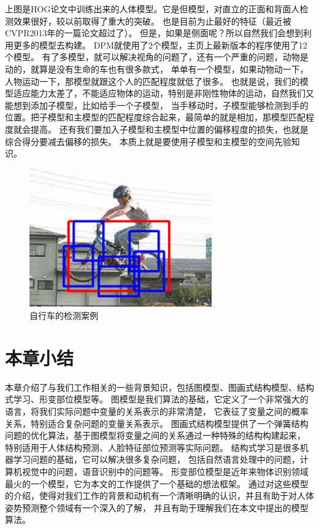上图是HOG论文中训练出来的人体模型。它是但模型，对直立的正面和背面人检测效果很好，较以前取得了重大的突破。
也是目前为止最好的特征（最近被CVPR2013年的一篇论文\cite{hsc}超过了）。
但是，如果是侧面呢？所以自然我们会想到利用更多的模型去构建。
DPM就使用了2个模型，主页上最新版本的程序使用了12个模型。
有了多模型，就可以解决视角的问题了，还有一个严重的问题，动物是动的，就算是没有生命的车也有很多款式，
单单有一个模型，如果动物动一下，人物运动一下，那模型就跟这个人的匹配程度就低了很多。
也就是说，我们的模型适应能力太差了，不能适应物体的运动，特别是非刚性物体的运动，自然我们又能想到添加子模型，比如给手一个子模型，
当手移动时，子模型能够检测到手的位置。把子模型和主模型的匹配程度综合起来，最简单的就是相加，那模型匹配程度就会提高。
还有我们要加入子模型和主模型中位置的偏移程度的损失，也就是综合得分要减去偏移的损失。
本质上就是要使用子模型和主模型的空间先验知识。

\begin{figure}
\centering
\includegraphics[width=0.7\textwidth]{img/dpm1.png}
\caption{自行车的检测案例}
\label{fig:dpm1}
\end{figure}

\section{本章小结}
本章介绍了与我们工作相关的一些背景知识，包括图模型、图画式结构模型、结构式学习、形变部位模型等。
图模型是我们算法的基础，它定义了一个非常强大的语言，将我们实际问题中变量的关系表示的非常清楚，
它表征了变量之间的概率关系，特别适合复杂问题的变量关系表示。
图画式结构模型提供了一个弹簧结构问题的优化算法，基于图模型将变量之间的关系通过一种特殊的结构构建起来，
特别适用于人体结构预测、人脸特征部位预测等实际问题。
结构式学习是很多机器学习问题的基础，它可以解决很多复杂问题，
包括自然语言处理中的问题，计算机视觉中的问题，语音识别中的问题等。
形变部位模型是近年来物体识别领域最火的一个模型，它为本文的工作提供了一个基础的想法框架。
通过对这些模型的介绍，使得对我们工作的背景和动机有一个清晰明确的认识，并且有助于对人体姿势预测整个领域有一个深入的了解，
并且有助于理解我们在本文中提出的模型算法。
